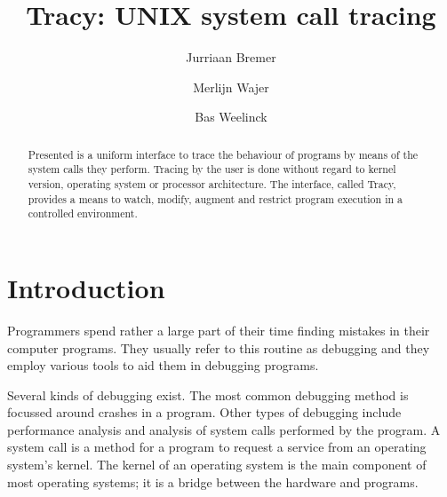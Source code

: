 \documentclass[a4paper, 10pt]{report}
\author{Jurriaan Bremer \and Merlijn Wajer \and Bas Weelinck}
\title{Tracy: UNIX system call tracing}
\begin{document}
\maketitle

\nocite{*}


\begin{abstract}
Presented is a uniform interface to trace the behaviour of programs
by means of the system calls they perform. Tracing by the user is done without
regard to kernel version, operating system or processor architecture.
The interface, called Tracy, provides a means to watch, modify, augment
and restrict program execution in a controlled environment.
\end{abstract}

\tableofcontents

%
%
%

\chapter{Introduction}

Programmers spend rather a large part of their time finding mistakes in their
computer programs. They usually refer to this routine as debugging and
they employ various tools to aid them in debugging programs.

Several kinds of debugging exist. The most common debugging method is
focussed around crashes in a program. Other types of debugging include
performance analysis and analysis of system calls performed by the program.
A system call is a method for a program to request a service from an operating
system's kernel. The kernel of an operating system is the main component
of most operating systems; it is a bridge between the hardware and programs.
\end{document}
